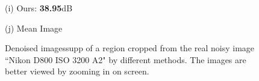 \documentclass[10pt,onecolumn,letterpaper]{article}
\begin{document}
\begin{figure}[H]
{\begin{minipage}[t]{0.196\textwidth}
{\footnotesize (i) Ours: \textbf{38.95}dB  }
\end{minipage}
\begin{minipage}[t]{0.196\textwidth}
\centering
{}
{\footnotesize (j) Mean Image \cite{crosschannel2016} }
\end{minipage}
}
\caption{Denoised imagessupp of a region cropped from the real noisy image ``Nikon D800 ISO 3200 A2" \cite{crosschannel2016} by different methods. The images are better viewed by zooming in on screen.} 
\label{fig17}
\end{figure}
\end{document}

